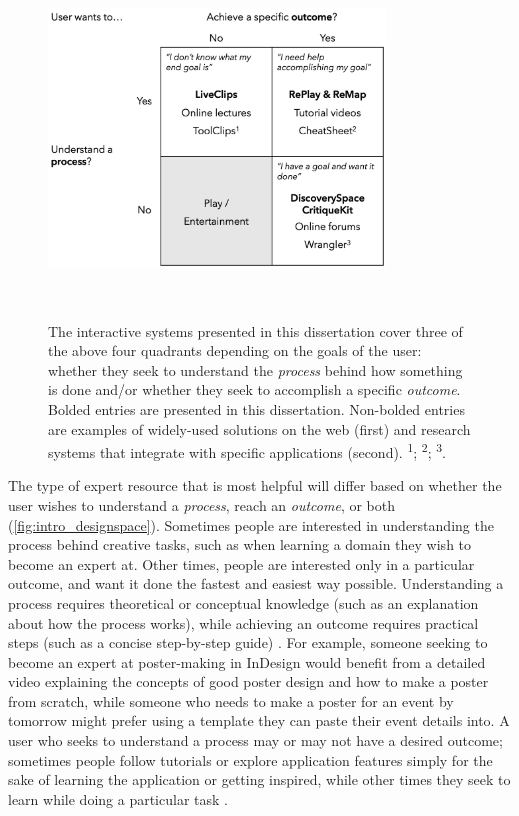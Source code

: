 \begin{figure}[b!]
\centering
  \includegraphics[width=0.8\textwidth]{figures/designspace.png}
  \caption[The interactive systems presented in this dissertation cover three of the above four quadrants depending on the goals of the user: whether they seek to understand the \textit{process} behind how something is done and/or whether they seek to accomplish a specific \textit{outcome}.]{The interactive systems presented in this dissertation cover three of the above four quadrants depending on the goals of the user: whether they seek to understand the \textit{process} behind how something is done and/or whether they seek to accomplish a specific \textit{outcome}. Bolded entries are presented in this dissertation. Non-bolded entries are examples of widely-used solutions on the web (first) and research systems that integrate with specific applications (second). \textsuperscript{1}\cite{Grossman2010a}; \textsuperscript{2}\cite{Vermette2015}; \textsuperscript{3}\cite{Kandel2011}.}~\label{fig:intro_designspace}
\end{figure}

The type of expert resource that is most helpful will differ based on whether the user wishes to understand a  \textit{process}, reach an \textit{outcome}, or both (\autoref{fig:intro_designspace}). Sometimes people are interested in understanding the process behind creative tasks, such as when learning a domain they wish to become an expert at. Other times, people are interested only in a particular outcome, and want it done the fastest and easiest way possible. Understanding a process requires theoretical or conceptual knowledge (such as an explanation about how the process works), while achieving an outcome requires practical steps (such as a concise step-by-step guide) \cite{Procida2017}. For example, someone seeking to become an expert at poster-making in InDesign would benefit from a detailed video explaining the concepts of good poster design and how to make a poster from scratch, while someone who needs to make a poster for an event by tomorrow might prefer using a template they can paste their event details into. A user who seeks to understand a process may or may not have a desired outcome; sometimes people follow tutorials or explore application features simply for the sake of learning the application or getting inspired, while other times they seek to learn while doing a particular task \cite{Lafreniere2013a, Procida2017}.

